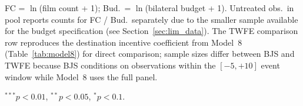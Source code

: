 \begin{table}[htbp]
\begin{minipage}{\textwidth}
\par FC = $\ln$(film count + 1); Bud.\ = $\ln$(bilateral budget + 1). Untreated obs.\ in pool reports counts for FC / Bud.\ separately due to the smaller sample available for the budget specification (see Section~\ref{sec:lim_data}). The TWFE comparison row reproduces the destination incentive coefficient from Model~8 (Table~\ref{tab:model8}) for direct comparison; sample sizes differ between BJS and TWFE because BJS conditions on observations within the $[-5, +10]$ event window while Model~8 uses the full panel.
\par $^{***}p<0.01$, $^{**}p<0.05$, $^{*}p<0.1$.
\end{minipage}
\end{table}

\clearpage




